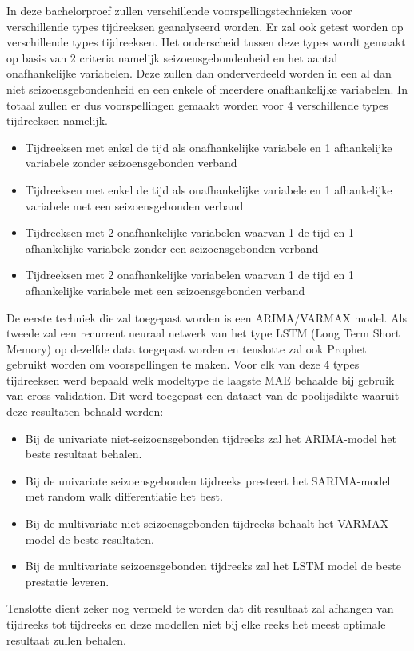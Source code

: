 In deze bachelorproef zullen verschillende voorspellingstechnieken voor verschillende types tijdreeksen geanalyseerd worden. Er zal ook getest worden op verschillende types tijdreeksen. Het onderscheid tussen deze types wordt gemaakt op basis van 2 criteria namelijk seizoensgebondenheid en het aantal onafhankelijke variabelen. Deze zullen dan onderverdeeld worden in een al dan niet seizoensgebondenheid en een enkele of meerdere onafhankelijke variabelen. In totaal zullen er dus voorspellingen gemaakt worden voor 4 verschillende types tijdreeksen namelijk.
\begin{itemize}
    \item Tijdreeksen met enkel de tijd als onafhankelijke variabele en 1 afhankelijke variabele zonder seizoensgebonden verband
    \item Tijdreeksen met enkel de tijd als onafhankelijke variabele en 1 afhankelijke variabele met een seizoensgebonden verband
    \item Tijdreeksen met 2 onafhankelijke variabelen waarvan 1 de tijd en 1 afhankelijke variabele zonder een seizoensgebonden verband
    \item Tijdreeksen met 2 onafhankelijke variabelen waarvan 1 de tijd en 1 afhankelijke variabele met een seizoensgebonden verband
\end{itemize} De eerste techniek die zal toegepast worden is een
 ARIMA/VARMAX model. Als tweede zal een  recurrent neuraal netwerk van het type LSTM (Long Term Short Memory) op dezelfde data toegepast worden en tenslotte zal ook Prophet gebruikt worden om voorspellingen te maken. Voor elk van deze 4 types tijdreeksen werd bepaald welk modeltype de laagste MAE behaalde bij gebruik van cross validation. Dit werd toegepast een dataset van de poolijsdikte waaruit deze resultaten behaald werden:
 \begin{itemize}
     \item Bij de univariate niet-seizoensgebonden tijdreeks zal het ARIMA-model het beste resultaat behalen.
     \item Bij de univariate seizoensgebonden tijdreeks presteert het SARIMA-model met random walk differentiatie het best.
     \item Bij de multivariate niet-seizoensgebonden tijdreeks behaalt het VARMAX-model de beste resultaten.
     \item Bij de multivariate seizoensgebonden tijdreeks zal het LSTM model de beste prestatie leveren.
 \end{itemize}

Tenslotte dient zeker nog vermeld te worden dat dit resultaat zal afhangen van tijdreeks tot tijdreeks en deze modellen niet bij elke reeks het meest optimale resultaat zullen behalen.
